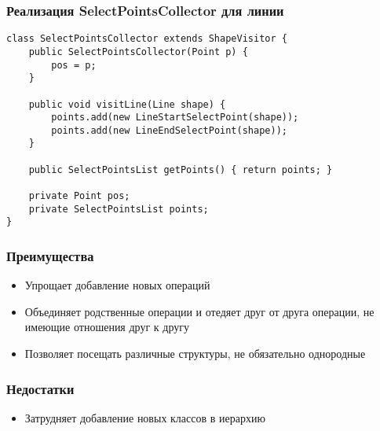 \documentclass[handout]{beamer}
\begin{document}
\begin{frame}[fragile]
\frametitle{Реализация SelectPointsCollector для линии}
\begin{lstlisting}
class SelectPointsCollector extends ShapeVisitor {
    public SelectPointsCollector(Point p) {
        pos = p;
    }
    
    public void visitLine(Line shape) {
        points.add(new LineStartSelectPoint(shape));
        points.add(new LineEndSelectPoint(shape));
    }
    
    public SelectPointsList getPoints() { return points; }

    private Point pos;
    private SelectPointsList points;
}
\end{lstlisting}
\end{frame}


\begin{frame}[fragile]
\frametitle{Преимущества}
\begin{itemize}
\item Упрощает добавление новых операций
\item Объединяет родственные операции и отедяет друг от друга операции, не
      имеющие отношения друг к другу
\item Позволяет посещать различные структуры, не обязательно однородные
\end{itemize}
\end{frame}



\begin{frame}[fragile]
\frametitle{Недостатки}
\begin{itemize}
\item Затрудняет добавление новых классов в иерархию
\end{itemize}
\end{frame}
\end{document}
